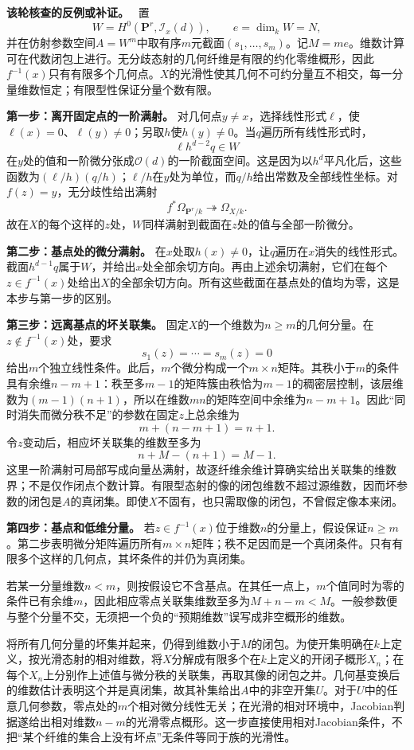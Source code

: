 \documentclass[UTF8,a4paper]{ctexbook}
\newcommand{\lead}[1]{\par\noindent\textbf{#1}\quad}
\newenvironment{analysisproof}{\par\noindent\textbf{该轮核查的反例或补证。}\ }{\par}
\begin{document}
\begin{analysisproof}
置
\[
W=H^0(\mathbf P^r,\mathcal I_x(d)),\qquad
e=\dim_kW=N,
\]
并在仿射参数空间$A=W^m$中取有序$m$元截面$(s_1,\ldots,s_m)$。记$M=me$。维数计算可在代数闭包上进行。无分歧态射的几何纤维是有限的约化零维概形，因此$f^{-1}(x)$只有有限多个几何点。$X$的光滑性使其几何不可约分量互不相交，每一分量维数恒定；有限型性保证分量个数有限。

\lead{第一步：离开固定点的一阶满射。}
对几何点$y\ne x$，选择线性形式$\ell$，使$\ell(x)=0$、$\ell(y)\ne0$；另取$h$使$h(y)\ne0$。当$q$遍历所有线性形式时，
\[
\ell h^{d-2}q\in W
\]
在$y$处的值和一阶微分张成$\mathcal O(d)$的一阶截面空间。这是因为以$h^d$平凡化后，这些函数为$(\ell/h)(q/h)$；$\ell/h$在$y$处为单位，而$q/h$给出常数及全部线性坐标。对$f(z)=y$，无分歧性给出满射
\[
f^*\Omega_{\mathbf P^r/k}\twoheadrightarrow\Omega_{X/k}.
\]
故在$X$的每个这样的$z$处，$W$同样满射到截面在$z$处的值与全部一阶微分。

\lead{第二步：基点处的微分满射。}
在$x$处取$h(x)\ne0$，让$q$遍历在$x$消失的线性形式。截面$h^{d-1}q$属于$W$，并给出$x$处全部余切方向。再由上述余切满射，它们在每个$z\in f^{-1}(x)$处给出$X$的全部余切方向。所有这些截面在基点处的值均为零，这是本步与第一步的区别。

\lead{第三步：远离基点的坏关联集。}
固定$X$的一个维数为$n\geq m$的几何分量。在$z\notin f^{-1}(x)$处，要求
\[
s_1(z)=\cdots=s_m(z)=0
\]
给出$m$个独立线性条件。此后，$m$个微分构成一个$m\times n$矩阵。其秩小于$m$的条件具有余维$n-m+1$：秩至多$m-1$的矩阵簇由秩恰为$m-1$的稠密层控制，该层维数为$(m-1)(n+1)$，所以在维数$mn$的矩阵空间中余维为$n-m+1$。因此“同时消失而微分秩不足”的参数在固定$z$上总余维为
\[
m+(n-m+1)=n+1.
\]
令$z$变动后，相应坏关联集的维数至多为
\[
n+M-(n+1)=M-1.
\]
这里一阶满射可局部写成向量丛满射，故逐纤维余维计算确实给出关联集的维数界；不是仅作闭点个数计算。有限型态射的像的闭包维数不超过源维数，因而坏参数的闭包是$A$的真闭集。即使$X$不固有，也只需取像的闭包，不曾假定像本来闭。

\lead{第四步：基点和低维分量。}
若$z\in f^{-1}(x)$位于维数$n$的分量上，假设保证$n\geq m$。第二步表明微分矩阵遍历所有$m\times n$矩阵；秩不足因而是一个真闭条件。只有有限多个这样的几何点，其坏条件的并仍为真闭集。

若某一分量维数$n<m$，则按假设它不含基点。在其任一点上，$m$个值同时为零的条件已有余维$m$，因此相应零点关联集维数至多为$M+n-m<M$。一般参数便与整个分量不交，无须把一个负的“预期维数”误写成非空概形的维数。

将所有几何分量的坏集并起来，仍得到维数小于$M$的闭包。为使开集明确在$k$上定义，按光滑态射的相对维数，将$X$分解成有限多个在$k$上定义的开闭子概形$X_n$；在每个$X_n$上分别作上述值与微分秩的关联集，再取其像的闭包之并。几何基变换后的维数估计表明这个并是真闭集，故其补集给出$A$中的非空开集$U$。对于$U$中的任意几何参数，零点处的$m$个相对微分线性无关；在光滑的相对环境中，Jacobian判据遂给出相对维数$n-m$的光滑零点概形。这一步直接使用相对Jacobian条件，不把“某个纤维的集合上没有坏点”无条件等同于族的光滑性。


\end{analysisproof}
\end{document}
